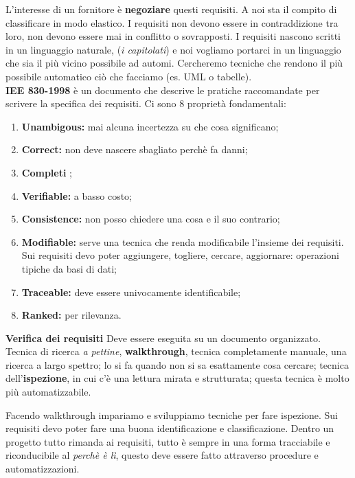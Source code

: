 L'interesse di un fornitore è \textbf{negoziare} questi requisiti. A noi sta il compito di classificare in modo elastico. I requisiti non devono essere in contraddizione tra loro, non devono essere mai in conflitto o sovrapposti. I requisiti nascono scritti in un linguaggio naturale, (\textit{i capitolati}) e noi vogliamo portarci in un linguaggio che sia il più vicino possibile ad automi. Cercheremo tecniche che rendono il più possibile automatico ciò che facciamo (es. UML o tabelle).\\

\textbf{IEE 830-1998} è un documento che descrive le pratiche raccomandate per scrivere la specifica dei requisiti. Ci sono 8 proprietà fondamentali:

\begin{enumerate}

	\item \textbf{Unambigous:} mai alcuna incertezza su che cosa significano;
	\item \textbf{Correct:} non deve nascere sbagliato perchè fa danni;
	\item \textbf{Completi} ;
	\item \textbf{Verifiable:} a basso costo;
	\item \textbf{Consistence:} non posso chiedere una cosa e il suo contrario;
	\item \textbf{Modifiable:} serve una tecnica che renda modificabile l'insieme dei requisiti. Sui requisiti devo poter aggiungere, togliere, cercare, aggiornare: operazioni tipiche da basi di dati;
	\item \textbf{Traceable:} deve essere univocamente identificabile;
	\item \textbf{Ranked:} per rilevanza.

\end{enumerate}

\textbf{Verifica dei requisiti}
Deve essere eseguita su un documento organizzato. Tecnica di ricerca \textit{a pettine}, \textbf{walkthrough}, tecnica completamente manuale, una ricerca a largo spettro; lo si fa quando non si sa esattamente cosa cercare; tecnica dell'\textbf{ispezione}, in cui c'è una lettura mirata e strutturata; questa tecnica è molto più automatizzabile. 

Facendo walkthrough impariamo e sviluppiamo tecniche per fare ispezione. Sui requisiti devo poter fare una buona identificazione e classificazione. Dentro un progetto tutto rimanda ai requisiti, tutto è sempre in una forma tracciabile e riconducibile al \textit{perchè è lì}, questo deve essere fatto attraverso procedure e automatizzazioni.\\

